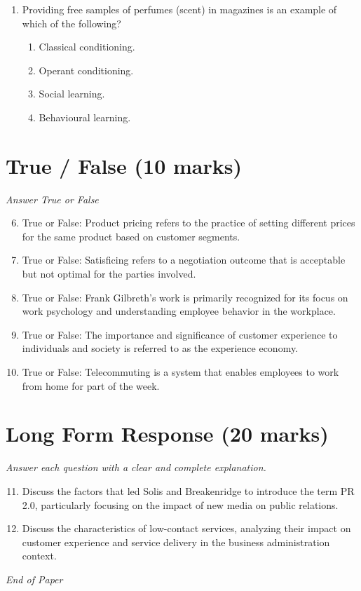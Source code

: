 \documentclass[12pt]{article}
\begin{document}
\begin{enumerate}[label=\arabic*.]
\begin{enumerate}[label=(\alph*)]
    \item Reputation
    \item Impact
    \item Familiarity with subject or issue
    \item Ability to reach people
\end{enumerate}
\item Providing free samples of perfumes (scent) in magazines is an example of which of the following?
\begin{enumerate}[label=(\alph*)]
    \item Classical conditioning.
    \item Operant conditioning.
    \item Social learning.
    \item Behavioural learning.
\end{enumerate}
\end{enumerate}

\section*{True / False (10 marks)}
\textit{Answer True or False}
\begin{enumerate}[label=\arabic*.]
\setcounter{enumi}{5}
\item True or False: Product pricing refers to the practice of setting different prices for the same product based on customer segments.
\item True or False: Satisficing refers to a negotiation outcome that is acceptable but not optimal for the parties involved.
\item True or False: Frank Gilbreth's work is primarily recognized for its focus on work psychology and understanding employee behavior in the workplace.
\item True or False: The importance and significance of customer experience to individuals and society is referred to as the experience economy.
\item True or False: Telecommuting is a system that enables employees to work from home for part of the week.
\end{enumerate}

\section*{Long Form Response (20 marks)}
\textit{Answer each question with a clear and complete explanation.}
\begin{enumerate}[label=\arabic*.]
\setcounter{enumi}{10}
\item Discuss the factors that led Solis and Breakenridge to introduce the term PR 2.0, particularly focusing on the impact of new media on public relations.
\item Discuss the characteristics of low-contact services, analyzing their impact on customer experience and service delivery in the business administration context.
\end{enumerate}

\vfill
\noindent\textit{End of Paper}
\end{document}
